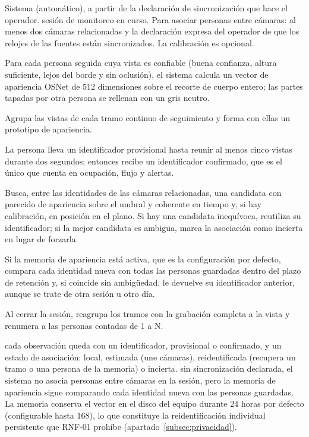   {Sistema (automático), a partir de la declaración de sincronización que hace el operador.}
  {sesión de monitoreo en curso. Para asociar personas entre cámaras: al menos dos cámaras
   relacionadas y la declaración expresa del operador de que los relojes de las fuentes están
   sincronizados. La calibración es opcional.}
  {\item Para cada persona seguida cuya vista es confiable (buena confianza, altura suficiente,
         lejos del borde y sin oclusión), el sistema calcula un vector de apariencia OSNet de 512
         dimensiones sobre el recorte de cuerpo entero; las partes tapadas por otra persona se
         rellenan con un gris neutro.
   \item Agrupa las vistas de cada tramo continuo de seguimiento y forma con ellas un prototipo
         de apariencia.
   \item La persona lleva un identificador provisional hasta reunir al menos cinco vistas durante
         dos segundos; entonces recibe un identificador confirmado, que es el único que cuenta en
         ocupación, flujo y alertas.
   \item Busca, entre las identidades de las cámaras relacionadas, una candidata con parecido de
         apariencia sobre el umbral y coherente en tiempo y, si hay calibración, en posición en el
         plano. Si hay una candidata inequívoca, reutiliza su identificador; si la mejor candidata es
         ambigua, marca la asociación como incierta en lugar de forzarla.
   \item Si la memoria de apariencia está activa, que es la configuración por defecto, compara
         cada identidad nueva con todas las personas guardadas dentro del plazo de retención y,
         si coincide sin ambigüedad, le devuelve su identificador anterior, aunque se trate de otra
         sesión u otro día.
   \item Al cerrar la sesión, reagrupa los tramos con la grabación completa a la vista y renumera
         a las personas contadas de 1 a N.}
  {cada observación queda con un identificador, provisional o confirmado, y un estado de
   asociación: local, estimada (une cámaras), reidentificada (recupera un tramo o una persona de
   la memoria) o incierta.}
  {sin sincronización declarada, el sistema no asocia personas entre cámaras en la sesión, pero
   la memoria de apariencia sigue comparando cada identidad nueva con las personas guardadas.
   La memoria conserva el vector en el disco del equipo durante 24 horas por defecto
   (configurable hasta 168), lo que constituye la reidentificación individual persistente que
   RNF-01 prohíbe (apartado~\ref{subsec:privacidad}).}


